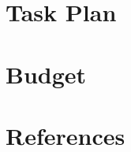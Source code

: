 \documentclass[a4paper,10pt]{article}
\begin{document}
\section{Task Plan}

\section{Budget}

\section{References}
\printbibliography
\end{document}
